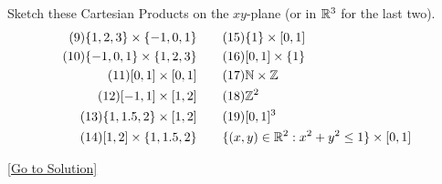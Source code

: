 \begin{exercise}\label{ex:2.2}
    Sketch these Cartesian Products on the $xy$-plane (or in $\mathbb{R}^3$ for the last two).
    $$
    \begin{aligned}
        (9) \{ 1,2,3 \}\times \{ -1,0,1 \} &\quad\quad (15) \{ 1 \}\times [0,1]\\
        (10) \{ -1,0,1 \}\times \{ 1,2,3 \} &\quad\quad (16) [0,1]\times \{ 1 \}\\
        (11) [0,1]\times[0,1] &\quad\quad (17) \mathbb{N}\times\mathbb{Z}\\
        (12) [-1,1]\times [1,2] &\quad\quad (18) \mathbb{Z}^2\\
        (13) \{ 1,1.5,2 \}\times[1,2] &\quad\quad (19) [0,1]^3\\
        (14) [1,2]\times \{ 1,1.5,2 \} &\quad\quad \{ (x,y)\in\mathbb{R}^2:x^2+y^2\le 1 \}\times[0,1]
    \end{aligned}
    $$
\end{exercise}\hyperref[sol:2.2]{[Go to Solution]}